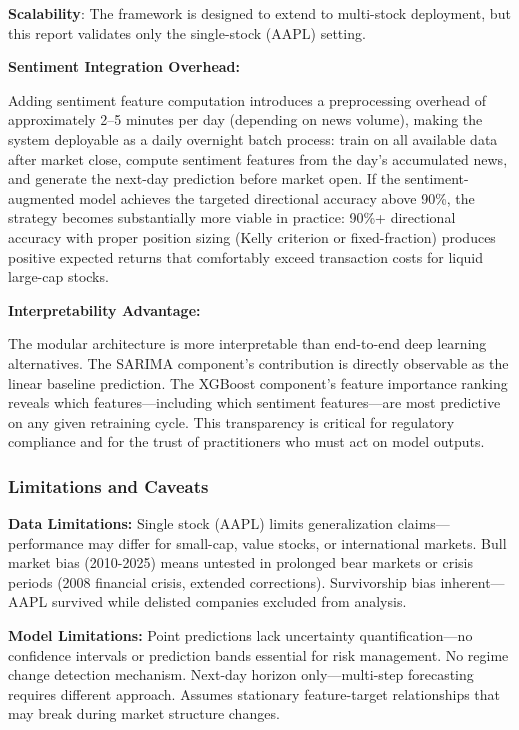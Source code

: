 \textbf{Scalability}: The framework is designed to extend to multi-stock deployment, but this report validates only the single-stock (AAPL) setting.

\textbf{Sentiment Integration Overhead:}

Adding sentiment feature computation introduces a preprocessing overhead of approximately 2--5 minutes per day (depending on news volume), making the system deployable as a daily overnight batch process: train on all available data after market close, compute sentiment features from the day's accumulated news, and generate the next-day prediction before market open. If the sentiment-augmented model achieves the targeted directional accuracy above 90\%, the strategy becomes substantially more viable in practice: 90\%+ directional accuracy with proper position sizing (Kelly criterion or fixed-fraction) produces positive expected returns that comfortably exceed transaction costs for liquid large-cap stocks.

\textbf{Interpretability Advantage:}

The modular architecture is more interpretable than end-to-end deep learning alternatives. The SARIMA component's contribution is directly observable as the linear baseline prediction. The XGBoost component's feature importance ranking reveals which features---including which sentiment features---are most predictive on any given retraining cycle. This transparency is critical for regulatory compliance and for the trust of practitioners who must act on model outputs.

\subsubsection{Limitations and Caveats}

\textbf{Data Limitations:}  
Single stock (AAPL) limits generalization claims—performance may differ for small-cap, value stocks, or international markets. Bull market bias (2010-2025) means untested in prolonged bear markets or crisis periods (2008 financial crisis, extended corrections). Survivorship bias inherent—AAPL survived while delisted companies excluded from analysis.

\textbf{Model Limitations:}  
Point predictions lack uncertainty quantification—no confidence intervals or prediction bands essential for risk management. No regime change detection mechanism. Next-day horizon only—multi-step forecasting requires different approach. Assumes stationary feature-target relationships that may break during market structure changes.

